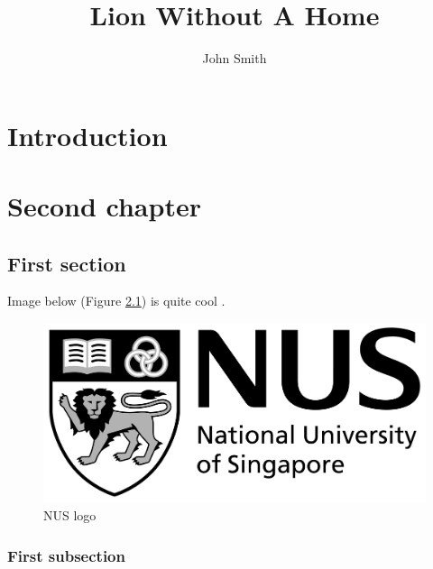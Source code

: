 \documentclass{nus-student-qe}
\author{John Smith}
\title{Lion Without A Home}
\begin{document}
	\maketitle
	
	\abstract
	\lipsum[1]
	
	\acknowledgments
	\lipsum[1]
	
	\tableofcontents
	\pagebreak
	
	\chapter{Introduction}
	\lipsum[1-4]
	
	\chapter{Second chapter}
	\lipsum[1]
	
	\section{First section}
	\lipsum[1]
	
	Image below (Figure \ref{fig:nus-logo}) is quite cool \cite{bellman}.
	
	\begin{figure}[!ht]
		\caption{NUS logo}
		\label{fig:nus-logo}
		\centering
		\includegraphics[scale=0.5]{images/nus-logo}
	\end{figure}
	
	\subsection{First subsection}
	\lipsum[1]
	
\end{document}
